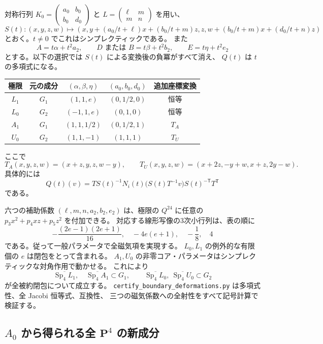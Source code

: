 対称行列 $K_0=\left(\begin{smallmatrix}a_0&b_0\\b_0&d_0\end{smallmatrix}\right)$ と
$L=\left(\begin{smallmatrix}\ell&m\\m&n\end{smallmatrix}\right)$ を用い、
\[
 S(t):(x,y,z,w)\longmapsto
 \left(x,y+(a_0/t+\ell)x+(b_0/t+m)z,
 z,w+(b_0/t+m)x+(d_0/t+n)z\right)
\]
とおく。$t\ne0$ でこれはシンプレクティックである。
また
\[
 A=t\alpha+t^2a_2,\qquad D\text{ または }B=t\beta+t^2b_2,
 \qquad E=t\eta+t^2e_2
\]
とする。以下の選択では $S(t)$ による変換後の負冪がすべて消え、
$Q(t)$ は $t$ の多項式になる。
\begin{center}
\begin{tabular}{c|c|c|c|c}
極限&元の成分&$(\alpha,\beta,\eta)$&$(a_0,b_0,d_0)$&追加座標変換\\\hline
$L_1$&$G_1$&$(1,1,e)$&$(0,1/2,0)$&恒等\\
$L_0$&$G_2$&$(-1,1,e)$&$(0,1,0)$&恒等\\
$A_1$&$G_1$&$(1,1,1/2)$&$(0,1/2,1)$&$T_A$\\
$U_0$&$G_2$&$(1,1,-1)$&$(1,1,1)$&$T_U$
\end{tabular}
\end{center}
ここで
\[
 T_A(x,y,z,w)=(x+z,y,z,w-y),\qquad
 T_U(x,y,z,w)=(x+2z,-y+w,x+z,2y-w).
\]
具体的には
\[
 Q(t)(v)=T S(t)^{-1}N_i(t)\bigl(S(t)T^{-1}v\bigr)S(t)^{-\mathsf T}T^{\mathsf T}
\]
である。

六つの補助係数 $(\ell,m,n,a_2,b_2,e_2)$ は、極限の $Q^{24}$ に任意の
$p_3x^2+p_4xz+p_5z^2$ を付加できる。
対応する線形写像の3次小行列は、表の順に
\[
 -\frac{(2e-1)(2e+1)}{16},\quad -4e(e+1),\quad -\frac18,\quad4
\]
である。従って一般パラメータで全磁気項を実現する。
$L_0,L_1$ の例外的な有限個の $e$ は閉包をとって含まれる。
$A_1,U_0$ の非零コア・パラメータはシンプレクティックな対角作用で動かせる。
これにより
\[
 \overline{\operatorname{Sp}_4L_1},\quad \overline{\operatorname{Sp}_4A_1}\subset G_1,
 \qquad
 \overline{\operatorname{Sp}_4L_0},\ \overline{\operatorname{Sp}_4U_0}\subset G_2
\]
が全被約閉包について成立する。
\texttt{certify\_boundary\_deformations.py} は多項式性、全 Jacobi 恒等式、互換性、
三つの磁気係数への全射性をすべて記号計算で検証する。

\subsection{\texorpdfstring{$A_0$}{A0} から得られる全 \texorpdfstring{$\mathbf P^4$}{P4} の新成分}

